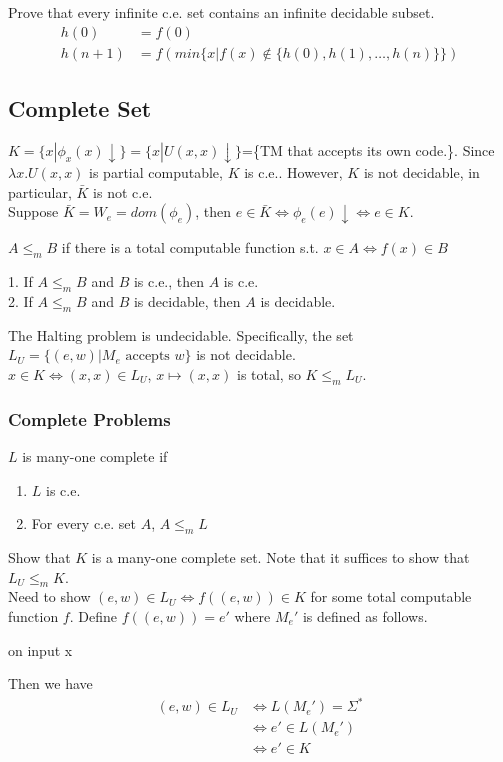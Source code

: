  Prove that every infinite c.e. set contains an infinite
decidable subset.
\begin{align*}
  h(0) &= f(0)\\
  h(n+1) &= f(min\{x|f(x) \notin \{h(0), h(1),\ldots, h(n)\}\})
\end{align*}


\subsection{Complete Set}

 $K=\{x|\phi_x(x)\downarrow\}=\{x|U(x,x)\downarrow\}$=\{TM
that accepts its own code.\}. Since $\lambda x.U(x,x)$ is partial computable,
$K$ is c.e.. However, $K$ is not decidable, in particular, $\bar{K}$ is not
c.e.\\
Suppose $\bar{K} = W_e = dom(\phi_e)$, then $e \in \bar{K} \Leftrightarrow
\phi_e(e)\downarrow \Leftrightarrow e \in K$.

 $A \le_m B$ if there is a total computable function
s.t. $x \in A \Leftrightarrow f(x) \in B$

 1. If $A \le_m B$ and $B$ is c.e., then $A$ is c.e.\\
2. If $A \le_m B$ and $B$ is decidable, then $A$ is decidable.

 The Halting problem is undecidable. Specifically, the set
$L_U=\{(e,w)|M_e \text{ accepts } w\}$ is not decidable.\\
$x \in K \Leftrightarrow (x,x) \in L_U$, $x \mapsto (x,x)$ is total, so $K \le_m
L_U$.

\subsubsection{Complete Problems}
 $L$ is many-one complete if
\begin{enumerate}
  \item $L$ is c.e.
  \item For every c.e. set $A$, $A \le_m L$
\end{enumerate}

 Show that $K$ is a many-one complete set. Note that it suffices
to show that $L_U \le_m K$.\\
Need to show $(e,w) \in L_U \Leftrightarrow f((e,w)) \in K$ for some total
computable function $f$. Define $f((e,w)) = e'$ where $M_e'$ is defined as
follows.\\
\begin{algorithm}[H]
  on input x\;
\end{algorithm}
Then we have
\begin{align*}
  (e,w) \in L_U & \Leftrightarrow L(M_e')=\Sigma^*\\
  & \Leftrightarrow e' \in L(M_e')\\
  & \Leftrightarrow e' \in K
\end{align*}


